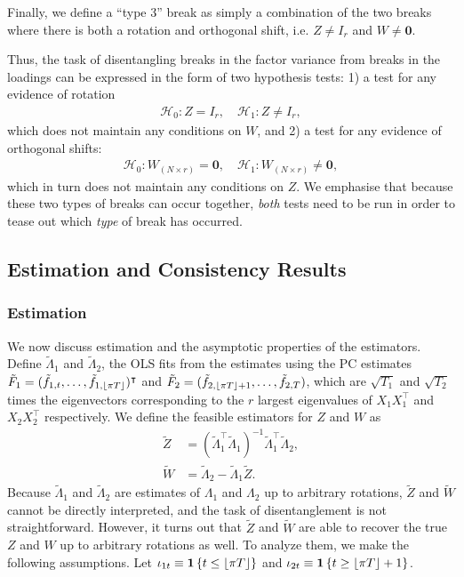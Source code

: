 \documentclass[12pt]{article}
\newcommand*{\tran}{\intercal}
\theoremstyle{plain}
\numberwithin{equation}{section}
\begin{document}
Finally, we define a ``type 3'' break as simply a combination of the two breaks where there is both a rotation and orthogonal shift, i.e. $Z \neq I_r$ and $W \neq \mathbf{0}$.

Thus, the task of disentangling breaks in the factor variance from breaks in the loadings can be expressed in the form of two hypothesis tests: 1) a test for any evidence of rotation
\begin{align}
\label{eqn:rotation_null}
\mathcal{H}_0: Z = I_r, \quad \mathcal{H}_1: Z \neq I_r,
\end{align}
which does not maintain any conditions on $W$, and 2) a test for any evidence of orthogonal shifts:
\begin{align}
\label{eqn:orthogonal_null}
\mathcal{H}_0: W_{(N \times r)} = \mathbf{0}, \quad \mathcal{H}_1: W_{(N \times r)} \neq \mathbf{0},
\end{align}
which in turn does not maintain any conditions on $Z$. We emphasise that because these two types of breaks can occur together, \emph{both} tests need to be run in order to tease out which \emph{type} of break has occurred. 
\subsection{Estimation and Consistency Results}
\subsubsection{Estimation}
We now discuss estimation and the asymptotic properties of the estimators. Define $\tilde{\Lambda}_1$ and $\tilde{\Lambda}_2$, the OLS fits from the estimates using the PC estimates $\tilde{F}_1 = (\tilde{f}_{1, t}, \dots, \tilde{f}_{1, \floor{\pi T}})^\tran$ and $\tilde{F}_2 = (\tilde{f}_{2, \left \lfloor \pi T \right \rfloor + 1}, \dots, \tilde{f}_{2, T})$, which are $\sqrt{T_1}$ and $\sqrt{T_2}$ times the eigenvectors corresponding to the $r$ largest eigenvalues of $X_1 X_1^\tran$ and $X_2 X_2^\tran$ respectively. We define the feasible estimators for $Z$ and $W$ as
\begin{align}
\label{eqn:Z_W_estimation}
\tilde{Z} &= (\tilde{\Lambda}_1^\tran \tilde{\Lambda}_1)^{-1} \tilde{\Lambda}_1^\tran \tilde{\Lambda}_2, \\
\label{eqn:W_estimation}
\tilde{W} &= \tilde{\Lambda}_2 - \tilde{\Lambda}_1 \tilde{Z}.
\end{align}
Because $\tilde{\Lambda}_1$ and $\tilde{\Lambda}_2$ are estimates of $\Lambda_1$ and $\Lambda_2$ up to arbitrary rotations, $\tilde{Z}$ and $\tilde{W}$ cannot be directly interpreted, and the task of disentanglement is not straightforward. However, it turns out that $\tilde{Z}$ and $\tilde{W}$ are able to recover the true $Z$ and $W$ up to arbitrary rotations as well. To analyze them, we make the following assumptions. Let $\iota_{1t} \equiv \mathbf{1} \left\lbrace t \leq \left \lfloor \pi T \right \rfloor \right\rbrace$ and $\iota_{2t} \equiv \mathbf{1} \left\lbrace t \geq \left \lfloor \pi T \right \rfloor + 1 \right\rbrace$. 
\end{document}
